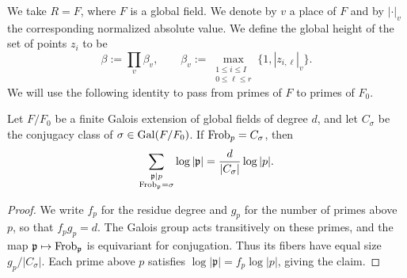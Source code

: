 \documentclass[reqno]{amsart} 
\begin{document}
We take $R = F$, where $F$ is a global field.  We denote by $v$ a place of $F$ and by $|\cdot|_v$ the corresponding normalized absolute value.  We define the global height of the set of points $z_i$ to be
\begin{equation}\label{eq:cus65o51ep}
  \beta := \prod_v\beta_v,
  \qquad \beta_v := \max_{\substack{1\leq i\leq I\\0\leq\ell\leq r}}\{1,|z_{i,\ell}|_v\}.
\end{equation}
We will use the following identity to pass from primes of $F$ to primes of $F_0$.
\begin{lemma}\label{lemma:frobenius-count}
  Let $F/F_0$ be a finite Galois extension of global fields of degree $d$, and let $C_\sigma$ be the conjugacy class of $\sigma\in\operatorname{Gal}(F/F_0)$.  If $\operatorname{Frob}_p=C_\sigma$, then
  \begin{equation}\label{eq:cus6naqvq3}
    \sum_{\substack{\mathfrak{p}\mid p\\\operatorname{Frob}_{\mathfrak{p}}=\sigma}}
    \log|\mathfrak{p}|=\frac{d}{|C_\sigma|}\log|p|.
  \end{equation}
\end{lemma}
\begin{proof}
  We write $f_p$ for the residue degree and $g_p$ for the number of primes above $p$, so that $f_pg_p=d$.  The Galois group acts transitively on these primes, and the map $\mathfrak{p}\mapsto\operatorname{Frob}_{\mathfrak{p}}$ is equivariant for conjugation.  Thus its fibers have equal size $g_p/|C_\sigma|$.  Each prime above $p$ satisfies $\log|\mathfrak{p}|=f_p\log|p|$, giving the claim.
\end{proof}
\end{document}
